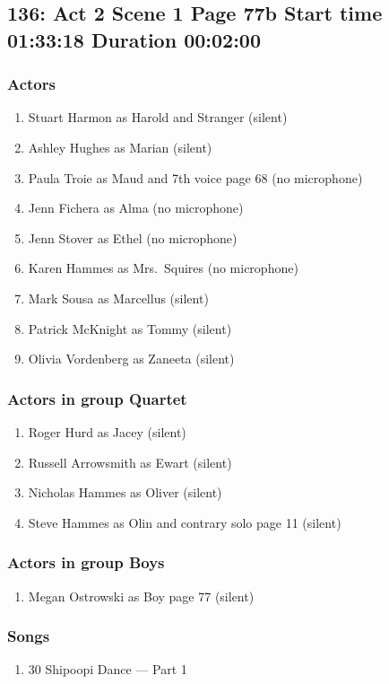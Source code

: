 \subsection{136: Act 2 Scene 1 Page 77b Start time 01:33:18 Duration 00:02:00}

\subsubsection{Actors}
\begin{enumerate}
\item Stuart Harmon as Harold and Stranger (silent)
\item Ashley Hughes as Marian (silent)
\item Paula Troie as Maud and 7th voice page 68 (no microphone)
\item Jenn Fichera as Alma (no microphone)
\item Jenn Stover as Ethel (no microphone)
\item Karen Hammes as Mrs.~Squires (no microphone)
\item Mark Sousa as Marcellus (silent)
\item Patrick McKnight as Tommy (silent)
\item Olivia Vordenberg as Zaneeta (silent)
\end{enumerate}
\subsubsection{Actors in group Quartet}
\begin{enumerate}
\item Roger Hurd as Jacey (silent)
\item Russell Arrowsmith as Ewart (silent)
\item Nicholas Hammes as Oliver (silent)
\item Steve Hammes as Olin and contrary solo page 11 (silent)
\end{enumerate}
\subsubsection{Actors in group Boys}
\begin{enumerate}
\item Megan Ostrowski as Boy page 77 (silent)
\end{enumerate}

\subsubsection{Songs}
\begin{enumerate}
\item 30 Shipoopi Dance --- Part 1
\end{enumerate}
